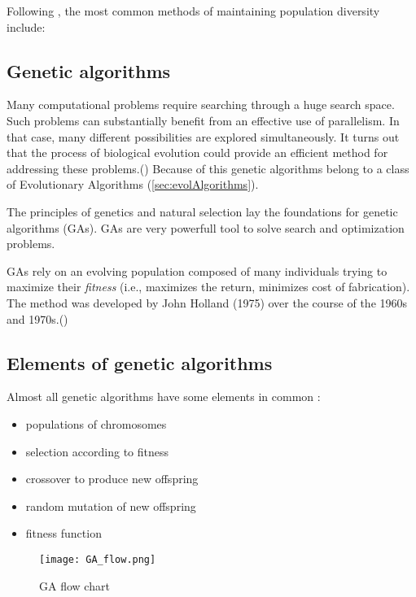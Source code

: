 Following \cite{Phd}, the most common methods of maintaining population diversity include:

\begin{}


\section{Genetic algorithms}
\label{sec:genAlgorithms}

Many computational problems require searching through a huge search space.
Such problems can substantially benefit from an effective use of parallelism.
In that case, many different possibilities are explored simultaneously. 
It turns out that the process of biological evolution could provide an efficient method for addressing these problems.(\cite{Mitchell01})
Because of this genetic algorithms belong to a class of Evolutionary Algorithms (\ref{sec:evolAlgorithms}).


The principles of genetics and natural selection lay the foundations for genetic algorithms (GAs).
GAs are very powerfull tool to solve search and optimization problems.

GAs rely on an evolving population composed of many individuals trying to maximize their \emph{fitness} (i.e., maximizes the return, minimizes cost of fabrication).  
The method was developed by John Holland (1975) over the course of the 1960s and 1970s.(\cite{Haupt:2004:PGA:1007746})

\subsection{Elements of genetic algorithms}

Almost all genetic algorithms have some elements in common \cite{Mitchell01}:
\begin{itemize}
  \item populations of chromosomes
  \item selection according to fitness
  \item crossover to produce new offspring
  \item random mutation of new offspring
  \item fitness function
\end{itemize}

\begin{figure}[ht]
  \begin{center}
    \texttt{[image: GA\_flow.png]}
  \end{center}
  \caption{GA flow chart \cite{Haupt:2004:PGA:1007746}}
\end{figure}


\end{}
